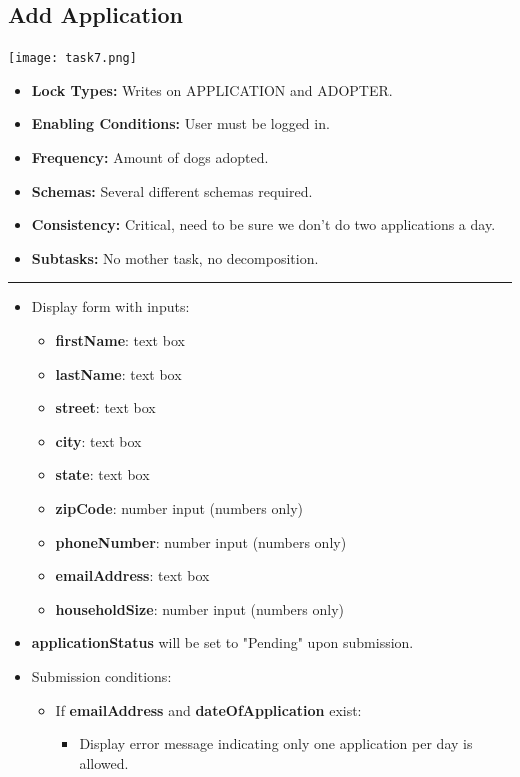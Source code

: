 \documentclass{article}
\begin{document}
\subsection{Add Application}
\begin{center}
    \texttt{[image: task7.png]}
\end{center}
\begin{itemize}
    \item \textbf{Lock Types:} Writes on APPLICATION and ADOPTER.
    \item \textbf{Enabling Conditions:} User must be logged in.
    \item \textbf{Frequency:} Amount of dogs adopted.
    \item \textbf{Schemas:} Several different schemas required.
    \item \textbf{Consistency:} Critical, need to be sure we don't do two applications a day.
    \item \textbf{Subtasks:} No mother task, no decomposition.
\end{itemize}
\noindent\rule{8cm}{0.4pt}
\begin{itemize}
    \item Display form with inputs:
    \begin{itemize}
        \item \textbf{firstName}: text box
        \item \textbf{lastName}: text box
        \item \textbf{street}: text box
        \item \textbf{city}: text box
        \item \textbf{state}: text box
        \item \textbf{zipCode}: number input (numbers only)
        \item \textbf{phoneNumber}: number input (numbers only)
        \item \textbf{emailAddress}: text box
        \item \textbf{householdSize}: number input (numbers only)
    \end{itemize}
    \item \textbf{applicationStatus} will be set to "Pending" upon submission.
    \item Submission conditions:
    \begin{itemize}
        \item If \textbf{emailAddress} and \textbf{dateOfApplication} exist:
        \begin{itemize}
            \item Display error message indicating only one application per day is allowed.
        \end{itemize}
    \end{itemize}
\end{itemize}
\end{document}

